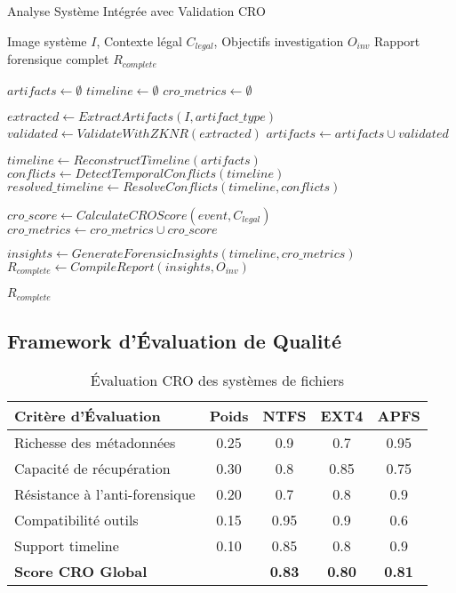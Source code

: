 \begin{algorithm}
\caption{Analyse Système Intégrée avec Validation CRO}
\begin{algorithmic}[1]
\REQUIRE Image système $I$, Contexte légal $C_{legal}$, Objectifs investigation $O_{inv}$
\ENSURE Rapport forensique complet $R_{complete}$

\STATE $artifacts \leftarrow \emptyset$
\STATE $timeline \leftarrow \emptyset$
\STATE $cro\_metrics \leftarrow \emptyset$

    \STATE $extracted \leftarrow ExtractArtifacts(I, artifact\_type)$
    \STATE $validated \leftarrow ValidateWithZKNR(extracted)$
    \STATE $artifacts \leftarrow artifacts \cup validated$
\ENDFOR

\STATE $timeline \leftarrow ReconstructTimeline(artifacts)$
\STATE $conflicts \leftarrow DetectTemporalConflicts(timeline)$
\STATE $resolved\_timeline \leftarrow ResolveConflicts(timeline, conflicts)$

    \STATE $cro\_score \leftarrow CalculateCROScore(event, C_{legal})$
    \STATE $cro\_metrics \leftarrow cro\_metrics \cup cro\_score$
\ENDFOR

\STATE $insights \leftarrow GenerateForensicInsights(timeline, cro\_metrics)$
\STATE $R_{complete} \leftarrow CompileReport(insights, O_{inv})$

\RETURN $R_{complete}$
\end{algorithmic}
\end{algorithm}

\subsection{Framework d'Évaluation de Qualité}

\begin{table}[h]
\centering
\begin{tabular}{|l|c|c|c|c|}
\hline
\textbf{Critère d'Évaluation} & \textbf{Poids} & \textbf{NTFS} & \textbf{EXT4} & \textbf{APFS} \\
\hline
Richesse des métadonnées & 0.25 & 0.9 & 0.7 & 0.95 \\
Capacité de récupération & 0.30 & 0.8 & 0.85 & 0.75 \\
Résistance à l'anti-forensique & 0.20 & 0.7 & 0.8 & 0.9 \\
Compatibilité outils & 0.15 & 0.95 & 0.9 & 0.6 \\
Support timeline & 0.10 & 0.85 & 0.8 & 0.9 \\
\hline
\textbf{Score CRO Global} & & \textbf{0.83} & \textbf{0.80} & \textbf{0.81} \\
\hline
\end{tabular}
\caption{Évaluation CRO des systèmes de fichiers}
\end{table}

